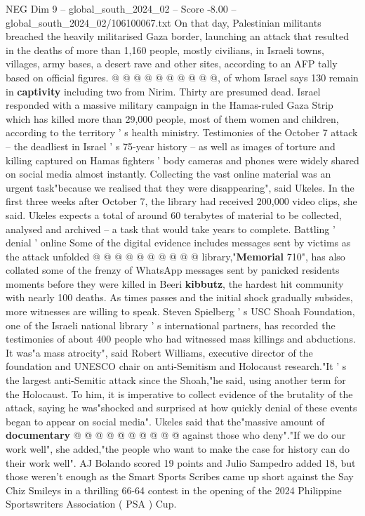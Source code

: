 \begin{textsample}{NEG Dim 9 – global\_south\_2024\_02 – Score -8.00 – global\_south\_2024\_02/106100067.txt}
On that day, Palestinian militants breached the heavily militarised Gaza border, launching an attack that resulted in the deaths of more than 1,160 people, mostly civilians, in Israeli towns, villages, army bases, a desert rave and other sites, according to an AFP tally based on official figures. @ @ @ @ @ @ @ @ @ @, of whom Israel says 130 remain in \textbf{captivity} including two from Nirim.
Thirty are presumed dead.
Israel responded with a massive military campaign in the Hamas-ruled Gaza Strip which has killed more than 29,000 people, most of them women and children, according to the territory ' s health ministry.
Testimonies of the October 7 attack -- the deadliest in Israel ' s 75-year history -- as well as images of torture and killing captured on Hamas fighters ' body cameras and phones were widely shared on social media almost instantly.
Collecting the vast online material was an urgent task"because we realised that they were disappearing", said Ukeles.
In the first three weeks after October 7, the library had received 200,000 video clips, she said.
Ukeles expects a total of around 60 terabytes of material to be collected, analysed and archived -- a task that would take years to complete.
Battling ' denial ' online Some of the digital evidence includes messages sent by victims as the attack unfolded @ @ @ @ @ @ @ @ @ @ library,"\textbf{Memorial} 710", has also collated some of the frenzy of WhatsApp messages sent by panicked residents moments before they were killed in Beeri \textbf{kibbutz}, the hardest hit community with nearly 100 deaths.
As times passes and the initial shock gradually subsides, more witnesses are willing to speak.
Steven Spielberg ' s USC Shoah Foundation, one of the Israeli national library ' s international partners, has recorded the testimonies of about 400 people who had witnessed mass killings and abductions.
It was"a mass atrocity", said Robert Williams, executive director of the foundation and UNESCO chair on anti-Semitism and Holocaust research."It ' s the largest anti-Semitic attack since the Shoah,"he said, using another term for the Holocaust.
To him, it is imperative to collect evidence of the brutality of the attack, saying he was"shocked and surprised at how quickly denial of these events began to appear on social media".
Ukeles said that the"massive amount of \textbf{documentary} @ @ @ @ @ @ @ @ @ @ against those who deny"."If we do our work well", she added,"the people who want to make the case for history can do their work well".
AJ Bolando scored 19 points and Julio Sampedro added 18, but those weren't enough as the Smart Sports Scribes came up short against the Say Chiz Smileys in a thrilling 66-64 contest in the opening of the 2024 Philippine Sportswriters Association ( PSA ) Cup.

\end{textsample}
